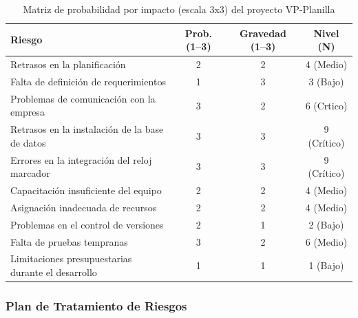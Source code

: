 \newpage

\begin{table}[h!]
	\centering
	\begin{tabular}{|p{6cm}|c|c|c|}
		\hline
		\textbf{Riesgo}                                    & \textbf{Prob. (1–3)} & \textbf{Gravedad (1–3)} & \textbf{Nivel (N)} \\ \hline
		Retrasos en la planificación                       & 2                    & 2                       & 4 (Medio)          \\ \hline
		Falta de definición de requerimientos              & 1                    & 3                       & 3 (Bajo)           \\ \hline
		Problemas de comunicación con la empresa           & 3                    & 2                       & 6 (Crtico)         \\ \hline
		Retrasos en la instalación de la base de datos     & 3                    & 3                       & 9 (Crítico)        \\ \hline
		Errores en la integración del reloj marcador       & 3                    & 3                       & 9 (Crítico)        \\ \hline
		Capacitación insuficiente del equipo               & 2                    & 2                       & 4 (Medio)          \\ \hline
		Asignación inadecuada de recursos                  & 2                    & 2                       & 4 (Medio)          \\ \hline
		Problemas en el control de versiones               & 2                    & 1                       & 2 (Bajo)           \\ \hline
		Falta de pruebas tempranas                         & 3                    & 2                       & 6 (Medio)          \\ \hline
		Limitaciones presupuestarias durante el desarrollo & 1                    & 1                       & 1 (Bajo)           \\ \hline
	\end{tabular}
	\caption{Matriz de probabilidad por impacto (escala 3x3) del proyecto VP-Planilla}
	\label{tab:matriz_prob_impacto_3x3}
\end{table}

\subsubsection*{Plan de Tratamiento de Riesgos}

